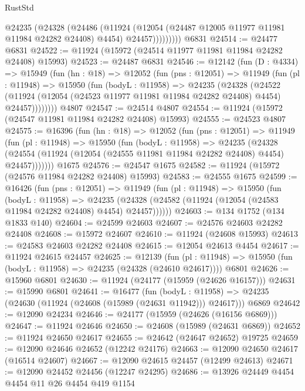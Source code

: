 \begin{lexlean}{RustStd}
\begin{coremodule}
{\begin{coremodule}
{{{{{{{{{{{{{{{{{{{{{{{{{{{{{{{{{{{{{{{{{{{{{{{{{{{{{{{{{{{{{{{{{{{{{{{{{{{{{{{{              @24235
                (@24328
                  (@24486
                    (@11924
                      (@12054 (@24487 @12005 @11977 @11981 @11984 @24282 @24408) @4454)
                      @24457)))))))))
    @6831
@24514 := @24477 @6831
@24522 := @11924 (@15972 (@24514 @11977 @11981 @11984 @24282 @24408) @15993)
@24523 := @24487 @6831
@24546 := @12142
    (fun (D : @4334) =>
    @15949
      (fun (hn : @18) =>
      @12052
        (fun (pns : @12051) =>
        @11949
          (fun (pl : @11948) =>
          @15950
            (fun (bodyL : @11958) =>
            @24235
              (@24328
                (@24522
                  (@11924 (@12054 (@24523 @11977 @11981 @11984 @24282 @24408) @4454) @24457))))))))
    @4807
@24547 := @24514 @4807
@24554 := @11924 (@15972 (@24547 @11981 @11984 @24282 @24408) @15993)
@24555 := @24523 @4807
@24575 := @16396
    (fun (hn : @18) =>
    @12052
      (fun (pns : @12051) =>
      @11949
        (fun (pl : @11948) =>
        @15950
          (fun (bodyL : @11958) =>
          @24235
            (@24328
              (@24554 (@11924 (@12054 (@24555 @11981 @11984 @24282 @24408) @4454) @24457)))))))
    @1675
@24576 := @24547 @1675
@24582 := @11924 (@15972 (@24576 @11984 @24282 @24408) @15993)
@24583 := @24555 @1675
@24599 := @16426
    (fun (pns : @12051) =>
    @11949
      (fun (pl : @11948) =>
      @15950
        (fun (bodyL : @11958) =>
        @24235 (@24328 (@24582 (@11924 (@12054 (@24583 @11984 @24282 @24408) @4454) @24457))))))
@24603 := @134 @1752 (@134 @1833 @140)
@24604 := @24599 @24603
@24607 := @24576 @24603 @24282 @24408
@24608 := @15972 @24607
@24610 := @11924 (@24608 @15993)
@24613 := @24583 @24603 @24282 @24408
@24615 := @12054 @24613 @4454
@24617 := @11924 @24615 @24457
@24625 := @12139
    (fun (pl : @11948) => @15950 (fun (bodyL : @11958) => @24235 (@24328 (@24610 @24617))))
    @6801
@24626 := @15960 @6801
@24630 := @11924 (@24177 (@15959 (@24626 @16157)))
@24631 := @15990 @6801
@24641 := @16477
    (fun (bodyL : @11958) => @24235 (@24630 (@11924 (@24608 (@15989 (@24631 @11942))) @24617)))
    @6869
@24642 := @12090 @24234
@24646 := @24177 (@15959 (@24626 (@16156 @6869)))
@24647 := @11924 @24646
@24650 := @24608 (@15989 (@24631 @6869))
@24652 := @11924 @24650 @24617
@24655 := @24642 (@24647 @24652) @19725
@24659 := @12090 @24646 @24652 (@12242 @24176)
@24663 := @12090 @24650 @24617 (@16514 @24607)
@24667 := @12090 @24615 @24457 (@12499 @24613)
@24671 := @12090 @24452 @24456 (@12247 @24295)
@24686 := @13926
    @24449
    @4454
    @4454
    @11
    @26
    @4454
    @419
    @1154
}}}}}}}}}}}}}}}}}}}}}}}}}}}}}}}}}}}}}}}}}}}}}}}}}}}}}}}}}}}}}}}}}}}}}}}}}}}}}}}}
\end{coremodule}}
\end{coremodule}
\end{lexlean}
